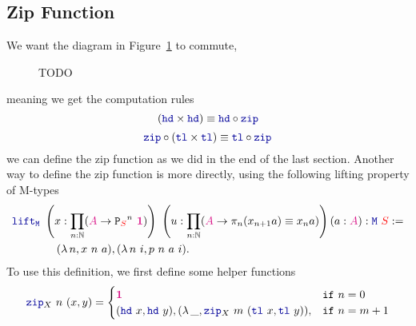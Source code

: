 \documentclass[twoside,11pt,openright]{report}
\newcommand*{\figref}[1]{Figure~\ref{#1}}
\newcommand*{\type}[1]{\textcolor{magenta!90!black}{#1}}
\newcommand*{\container}[1]{\textcolor{red}{#1}}
\newcommand*{\unit}{\type{\textbf{1}}}
\newcommand*{\function}[1]{\textcolor{blue!60!black}{\ensuremath{\mathtt{#1}}}}
\newcommand*{\typeformer}[1]{\ensuremath{\mathtt{#1}}}
\newcommand*{\functor}[1]{\ensuremath{\mathbf{\mathtt{#1}}}}
\begin{document}
\subsection{Zip Function}
We want the diagram in \figref{fig:zip-computation-rules} to commute,
\begin{figure}[h]
  \centering
  \caption{TODO}
  \label{fig:zip-computation-rules}
\end{figure}
meaning we get the computation rules
\begin{equation}
  (\function{hd} \times \function{hd}) \equiv \function{hd} \circ \function{zip}
\end{equation}
\begin{equation}
  \function{zip} \circ (\function{tl} \times \function{tl}) \equiv \function{tl} \circ \function{zip}
\end{equation}
we can define the zip function as we did in the end of the last section. Another way to define the zip function is more directly, using the following lifting property of M-types
\begin{equation}
\begin{aligned}
  &\function{lift_M}~\left(x : \prod_{n : \mathbb{N}} (\type{A} \rightarrow {\functor{P}_{\container{S}}}^n~\unit)\right)~\left(u : \prod_{n : \mathbb{N}} (\type{A} \rightarrow \pi_n (x_{n+1} a) \equiv x_n a)\right) (a : \type{A}) : \function{M}~\container{S} := \\
  &\qquad\qquad (\lambda\,n, x~n~a) , (\lambda\,n~i, p~n~a~i).
\end{aligned} \label{eq:M-lift}
\end{equation}
To use this definition, we first define some helper functions
\begin{equation}
  \function{zip}_{X}~n~(x , y) = \begin{cases} \unit & \mathtt{if}~n = 0 \\ (\function{hd}~x , \function{hd}~y) , (\lambda\,\_, \function{zip}_{X}~m~(\function{tl}~x,\function{tl}~y)) , & \mathtt{if}~n = m + 1 \end{cases}
\end{equation}
\end{document}
